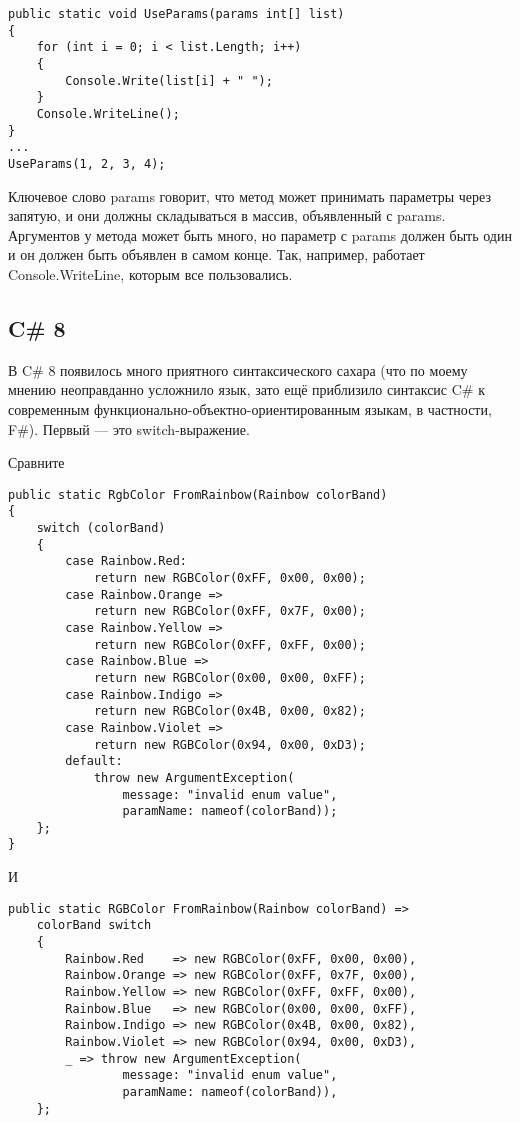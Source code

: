 \documentclass[a5paper]{article}
\begin{document}
\begin{verbatim}
public static void UseParams(params int[] list)
{
    for (int i = 0; i < list.Length; i++)
    {
        Console.Write(list[i] + " ");
    }
    Console.WriteLine();
}
...
UseParams(1, 2, 3, 4);
\end{verbatim}

Ключевое слово params говорит, что метод может принимать параметры через запятую, и они должны складываться в массив, объявленный с params. Аргументов у метода может быть много, но параметр с params должен быть один и он должен быть объявлен в самом конце. Так, например, работает Console.WriteLine, которым все пользовались.

\subsection{C\# 8}

В C\# 8 появилось много приятного синтаксического сахара (что по моему мнению неоправданно усложнило язык, зато ещё приблизило синтаксис C\# к современным функционально-объектно-ориентированным языкам, в частности, F\#). Первый --- это switch-выражение.

Сравните

\begin{verbatim}
public static RgbColor FromRainbow(Rainbow colorBand)
{ 
    switch (colorBand)
    {
        case Rainbow.Red: 
            return new RGBColor(0xFF, 0x00, 0x00);
        case Rainbow.Orange => 
            return new RGBColor(0xFF, 0x7F, 0x00);
        case Rainbow.Yellow => 
            return new RGBColor(0xFF, 0xFF, 0x00);
        case Rainbow.Blue => 
            return new RGBColor(0x00, 0x00, 0xFF);
        case Rainbow.Indigo => 
            return new RGBColor(0x4B, 0x00, 0x82);
        case Rainbow.Violet => 
            return new RGBColor(0x94, 0x00, 0xD3);
        default:
            throw new ArgumentException(
                message: "invalid enum value",
                paramName: nameof(colorBand));
    };
}
\end{verbatim}

И

\begin{verbatim}
public static RGBColor FromRainbow(Rainbow colorBand) =>
    colorBand switch
    {
        Rainbow.Red    => new RGBColor(0xFF, 0x00, 0x00),
        Rainbow.Orange => new RGBColor(0xFF, 0x7F, 0x00),
        Rainbow.Yellow => new RGBColor(0xFF, 0xFF, 0x00),
        Rainbow.Blue   => new RGBColor(0x00, 0x00, 0xFF),
        Rainbow.Indigo => new RGBColor(0x4B, 0x00, 0x82),
        Rainbow.Violet => new RGBColor(0x94, 0x00, 0xD3),
        _ => throw new ArgumentException(
                message: "invalid enum value", 
                paramName: nameof(colorBand)),
    };
\end{verbatim}
\end{document}
